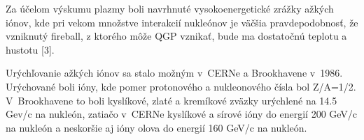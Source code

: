 Za účelom výskumu plazmy boli navrhnuté vysokoenergetické 
zrážky \softt{}ažkých  iónov, kde pri ve\softl{}kom
množstve interakcií nukleónov je väčšia pravdepodobnosť, 
že vzniknutý  fireball, z ktorého môže QGP vznikať, bude ma\softt{}
dostatočnú teplotu a hustotu [3]. 


Urýchľovanie \softt{}ažkých iónov sa stalo možným v~CERNe a 
Brookhavene v~1986.  Urých\softl{}ované boli ióny, kde pomer
protonového a nukleonového čísla bol Z/A=1/2. V~Brookhavene to
boli kyslíkové, zlaté a kremíkové zväzky urýchlené na 14.5
Gev/c na nukleón, zatia\softl{}čo v~CERNe kyslíkové a sírové
ióny  do energií 200 GeV/c na nukleón a neskoršie
aj ióny olova do energií 160 GeV/c na nukleón.
% 
% 
